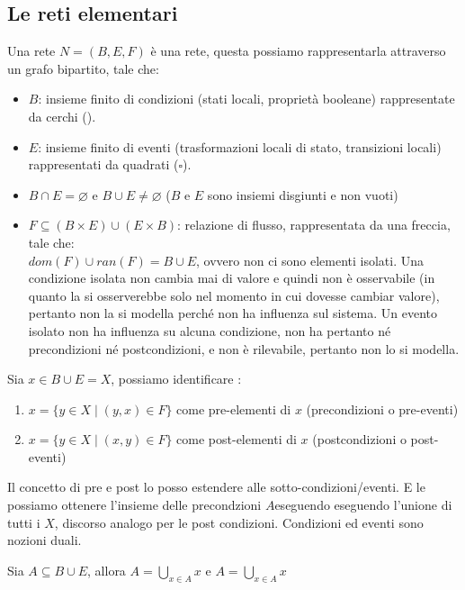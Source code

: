 \subsection{Le reti elementari}
Una rete $N = (B,E,F)$ è una rete, questa possiamo rappresentarla attraverso un grafo bipartito, tale che:
\begin{itemize}
    \item $B$: insieme finito di condizioni (stati locali, proprietà booleane) rappresentate da cerchi (\textbigcircle).
    \item $E$: insieme finito di eventi (trasformazioni locali di stato, transizioni locali) rappresentati da quadrati ($\square$).
    \item $B \cap E = \varnothing$ e $B \cup E \neq \varnothing$ ($B$ e $E$ sono insiemi disgiunti e non vuoti)
    \item $F \subseteq (B \times E) \cup (E \times B)$: relazione di flusso, rappresentata da una freccia, tale che:\\
        $dom(F) \cup ran(F) = B \cup E$, ovvero non ci sono elementi isolati.
        Una condizione isolata non cambia mai di valore e quindi non è osservabile (in quanto la si osserverebbe solo nel momento in cui dovesse cambiar valore), pertanto non la si modella perché non ha influenza sul sistema. 
        Un evento isolato non ha influenza su alcuna condizione, non ha pertanto né precondizioni né postcondizioni, e non è rilevabile, pertanto non lo si modella. 
\end{itemize}

Sia $x \in B \cup E = X$, possiamo identificare :
\begin{enumerate}
    \item \textbullet $ x = \{y \in X \; | \; (y,x) \in F\}$ come pre-elementi di $x$ (precondizioni o pre-eventi)
    \item $x$\textbullet$= \{y \in X \; | \; (x,y) \in F\}$	come post-elementi di $x$ (postcondizioni o post-eventi)
\end{enumerate}

Il concetto di pre e post lo posso estendere alle sotto-condizioni/eventi. E le possiamo ottenere l'insieme delle precondzioni \textbullet$A$eseguendo eseguendo l'unione di tutti i \textbullet$X$, discorso analogo per le post condizioni. Condizioni ed eventi sono nozioni duali. 

Sia $A \subseteq B \cup E$, allora \textbullet$A = \displaystyle \bigcup_{x \in A} $\textbullet$x$ e $A $\textbullet$ = \displaystyle \bigcup_{x \in A} x$\textbullet\\

